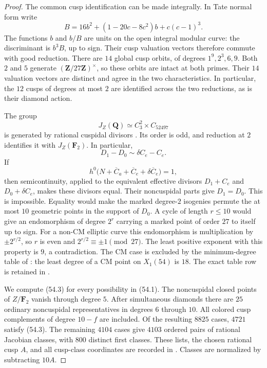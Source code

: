 \begin{proof}
The common cusp identification can be made integrally. In Tate normal
form write
\[
 B=16b^2+(1-20c-8c^2)b+c(c-1)^3.
\]
The functions $b$ and $b/B$ are units on the open integral modular curve:
the discriminant is $b^3B$, up to sign. Their cusp valuation vectors
therefore commute with good reduction. There are $14$ global cusp orbits,
of degrees $1^9,2^3,6,9$. Both $2$ and $5$ generate
$(\mathbf Z/27\mathbf Z)^\times$, so these orbits are intact at both
primes. Their $14$ valuation vectors are distinct and agree in the two
characteristics. In particular, the $12$ cusps of degrees at most $2$
are identified across the two reductions, as is their diamond action.

The group
\[
 J_Z(\mathbf Q)\simeq C_3^2\times C_{52497}
\]
is generated by rational cuspidal divisors
\cite[Theorem~4.13 and Table~2]{DEHMZ}. Its order is odd, and reduction
at $2$ identifies it with $J_Z(\mathbf F_2)$. In particular,
\[
 D_1-D_0\sim\delta C_e-C_e.                         \tag{54.2}
\]
If
\[
 h^0\bigl(N+\overline C_a+\overline C_e+
                     \delta\overline C_e\bigr)=1,                 \tag{54.3}
\]
then semicontinuity, applied to the equivalent effective divisors
$D_1+C_e$ and $D_0+\delta C_e$, makes these divisors equal.
Their noncuspidal parts give $D_1=D_0$.
This is impossible. Equality would make the marked degree-$2$
isogenies permute the at most $10$ geometric points in the support
of $D_0$. A cycle of length $r\leq10$ would give an endomorphism of
degree $2^r$ carrying a marked point of order $27$ to itself up to sign.
For a non-CM elliptic curve this endomorphism is multiplication by
$\pm2^{r/2}$, so $r$ is even and $2^{r/2}\equiv\pm1\pmod{27}$.
The least positive exponent with this property is $9$, a contradiction.
The CM case is excluded by the minimum-degree table of \cite{CGPS}:
the least degree of a CM point on $X_1(54)$ is $18$.
The exact table row is retained in .

We compute (54.3) for every possibility in (54.1). The noncuspidal
closed points of $Z/\mathbf F_2$ vanish through degree $5$.
After simultaneous diamonds there are $25$ ordinary noncuspidal representatives
in degrees $6$ through $10$. All colored cusp complements of degree
$10-f$ are included. Of the resulting $8825$ cases, $4721$ satisfy
(54.3). The remaining $4104$ cases give $4103$ ordered pairs of rational
Jacobian classes, with $800$ distinct first classes. These lists, the
chosen rational cusp $A$, and all cusp-class coordinates are recorded in
. Classes are normalized by subtracting $10A$.


\end{proof}
